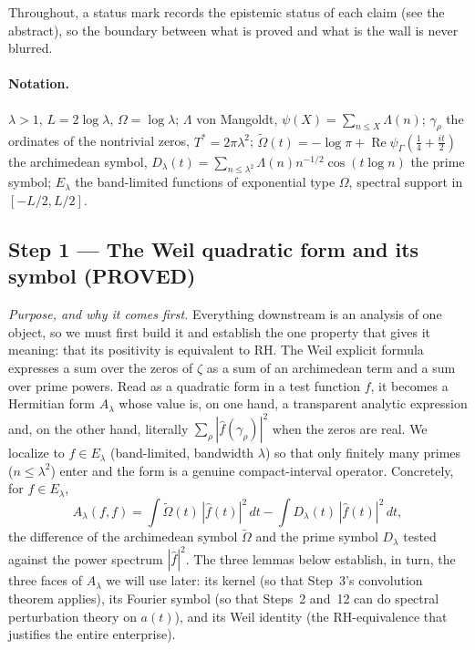 \documentclass[11pt]{amsart}
\theoremstyle{definition}
\theoremstyle{remark}
\newcommand{\Om}{\widetilde{\Omega}}
\newcommand{\PROVED}{\textbf{(PROVED)}}
\begin{document}
Throughout, a status mark records the epistemic status of each claim (see the abstract), so the
boundary between what is proved and what is the wall is never blurred.

\paragraph{Notation.} $\lambda>1$, $L=2\log\lambda$, $\Omega=\log\lambda$; $\Lambda$ von
Mangoldt, $\psi(X)=\sum_{n\le X}\Lambda(n)$; $\gamma_\rho$ the ordinates of the nontrivial
zeros, $T^*=2\pi\lambda^2$; $\Om(t)=-\log\pi+\operatorname{Re}\psi_\Gamma(\tfrac14+\tfrac{it}2)$
the archimedean symbol, $D_\lambda(t)=\sum_{n\le\lambda^2}\Lambda(n)n^{-1/2}\cos(t\log n)$ the
prime symbol; $E_\lambda$ the band-limited functions of exponential type $\Omega$, spectral
support in $[-L/2,L/2]$.

\subsection{Step 1 --- The Weil quadratic form and its symbol \PROVED}

\emph{Purpose, and why it comes first.} Everything downstream is an analysis of one object, so
we must first build it and establish the one property that gives it meaning: that its positivity
is equivalent to RH. The Weil explicit formula expresses a sum over the zeros of $\zeta$ as a
sum of an archimedean term and a sum over prime powers. Read as a quadratic form in a test
function $f$, it becomes a Hermitian form $A_\lambda$ whose value is, on one hand, a transparent
analytic expression and, on the other hand, literally $\sum_\rho|\hat f(\gamma_\rho)|^2$ when
the zeros are real. We localize to $f\in E_\lambda$ (band-limited, bandwidth $\lambda$) so that
only finitely many primes ($n\le\lambda^2$) enter and the form is a genuine compact-interval
operator. Concretely, for $f\in E_\lambda$,
\[
A_\lambda(f,f)=\int\Om(t)\,|\hat f(t)|^2\,dt-\int D_\lambda(t)\,|\hat f(t)|^2\,dt ,
\]
the difference of the archimedean symbol $\Om$ and the prime symbol $D_\lambda$ tested against
the power spectrum $|\hat f|^2$. The three lemmas below establish, in turn, the three faces of
$A_\lambda$ we will use later: its kernel (so that Step~3's convolution theorem applies), its
Fourier symbol (so that Steps~2 and~12 can do spectral perturbation theory on $a(t)$), and its
Weil identity (the RH-equivalence that justifies the entire enterprise).
\end{document}
